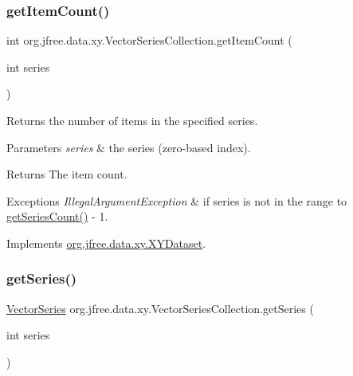 \subsubsection{\texorpdfstring{get\+Item\+Count()}{getItemCount()}}
{\footnotesize\ttfamily int org.\+jfree.\+data.\+xy.\+Vector\+Series\+Collection.\+get\+Item\+Count (\begin{DoxyParamCaption}\item[{int}]{series }\end{DoxyParamCaption})}

Returns the number of items in the specified series.


\begin{DoxyParams}{Parameters}
{\em series} & the series (zero-\/based index).\\
\hline
\end{DoxyParams}
\begin{DoxyReturn}{Returns}
The item count.
\end{DoxyReturn}

\begin{DoxyExceptions}{Exceptions}
{\em Illegal\+Argument\+Exception} & if {\ttfamily series} is not in the range {} to {\ttfamily \mbox{\hyperlink{classorg_1_1jfree_1_1data_1_1xy_1_1_vector_series_collection_ad7e902eb4447d1f31fb900fab80157b8}{get\+Series\+Count()}} -\/ 1}. \\
\hline
\end{DoxyExceptions}


Implements \mbox{\hyperlink{interfaceorg_1_1jfree_1_1data_1_1xy_1_1_x_y_dataset_ae81f9de91dfcae45028fc8a486a119da}{org.\+jfree.\+data.\+xy.\+X\+Y\+Dataset}}.

\mbox{\label{classorg_1_1jfree_1_1data_1_1xy_1_1_vector_series_collection_a25bcb72f6c5f64dd673887d056cef34d}} 
\subsubsection{\texorpdfstring{get\+Series()}{getSeries()}}
{\footnotesize\ttfamily \mbox{\hyperlink{classorg_1_1jfree_1_1data_1_1xy_1_1_vector_series}{Vector\+Series}} org.\+jfree.\+data.\+xy.\+Vector\+Series\+Collection.\+get\+Series (\begin{DoxyParamCaption}\item[{int}]{series }\end{DoxyParamCaption})}

